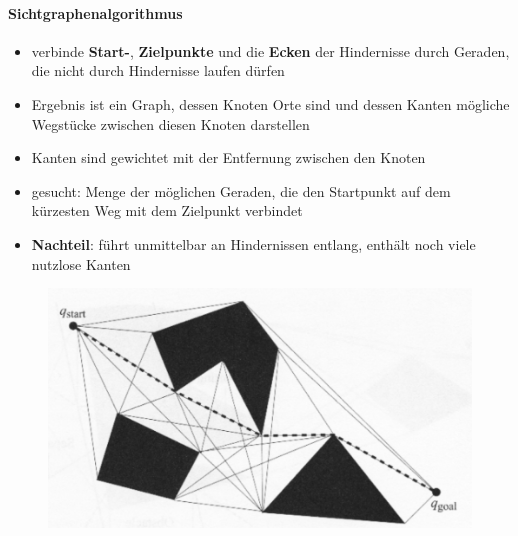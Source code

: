\paragraph{Sichtgraphenalgorithmus}
\begin{itemize}
	\item verbinde \textbf{Start-}, \textbf{Zielpunkte} und die \textbf{Ecken} der Hindernisse durch Geraden, die nicht durch Hindernisse laufen dürfen
	\item Ergebnis ist ein Graph, dessen Knoten Orte sind und dessen Kanten mögliche Wegstücke zwischen diesen Knoten darstellen
	\item Kanten sind gewichtet mit der Entfernung zwischen den Knoten
	\item gesucht: Menge der möglichen Geraden, die den Startpunkt auf dem kürzesten Weg mit dem Zielpunkt verbindet
	\item \textbf{Nachteil}: führt unmittelbar an Hindernissen entlang, enthält noch viele nutzlose Kanten
\end{itemize}
\begin{figure}[H]
	\begin{center}
		\includegraphics[scale=0.5]{Resources/PNG/Sichtgraphalgorithmus.PNG}
		\caption{}
		\label{fig:PNG/Sichtgraphalgorithmus.PNG}
	\end{center}
\end{figure}
